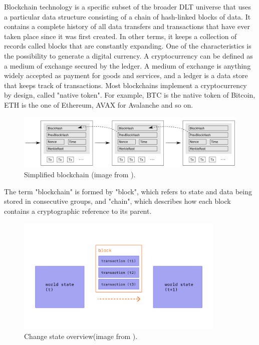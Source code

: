 Blockchain technology is a specific subset of the broader DLT universe that uses a 
particular data structure consisting of a chain of hash-linked blocks of data.
It contains a complete history of all data transfers and transactions that have ever taken place since it was first created.
In other terms, it keeps a collection of records called blocks that are constantly expanding.
One of the characteristics is the possibility to generate a digital currency. 
A cryptocurrency can be defined as a  medium of exchange secured by the ledger.
A medium of exchange is anything widely accepted as payment for goods and services, and a ledger is a data store that keeps track of transactions. 
Most blockchains implement a cryptocurrency by design, called "native token". 
For example, BTC is the native token of Bitcoin, ETH is the one of Ethereum, AVAX for Avalanche and so on.
\begin{figure}
    \centering
    \includegraphics[width=15cm]{logos/SimplifiedBlockChain.png}
    \caption{Simplified blockchain (image from \cite{BlockChain1}).}
    \label{fig:simpleBlockChain}
\end{figure}



The term "blockchain" is formed by "block", which refers to state and data being stored in consecutive groups, and "chain", 
which describes how each block contains a cryptographic reference to its parent. 
\begin{figure}
    \centering
    \includegraphics[width=10cm]{logos/tx-block.png}
    \caption{Change state overview(image from \cite{EthDocs}).}
    \label{fig:changeState}
\end{figure}

